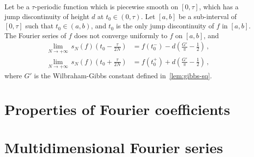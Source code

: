 \begin{theorem}
  Let be a $\tau$-periodic function which is piecewise smooth on $[0,\tau]$, which has a
  jump discontinuity of height $d$ at $t_0\in(0,\tau)$. Let $[a,b]$ be a sub-interval of
  $[0,\tau]$ such that $t_0\in(a,b)$, and $t_0$ is the only jump discontinuity of $f$ in
  $[a,b]$. The Fourier series of $f$ does not converge uniformly to $f$ on $[a,b]$, and
  \begin{align}
    \lim_{N\to+\infty}\,s_N(f)\left(t_0-\frac{\tau}{2N}\right)
    &=f(t_0^-)-d\left(\frac{G'}{\pi}-\frac12\right)\,,\\
    \lim_{N\to+\infty}\,s_N(f)\left(t_0+\frac{\tau}{2N}\right)
    &=f(t_0^+)+d\left(\frac{G'}{\pi}-\frac12\right)\,,
  \end{align}
  where $G'$ is the Wilbraham-Gibbs constant defined in~\cref{lem:gibbs-sq}.
\end{theorem}
\section{Properties of Fourier coefficients}
\section{Multidimensional Fourier series}
